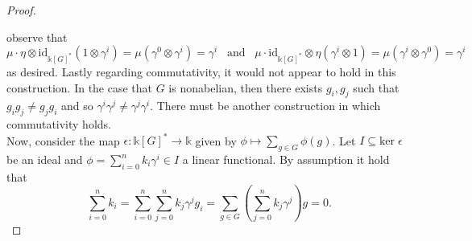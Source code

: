 \documentclass[ 12pt ]{article}
\begin{document}
\begin{enumerate}
\begin{proof}
\begin{center}
			\end{center}
			observe that $$\mu \cdot \eta \otimes \mathrm{id}_{\mathbb{k}[G]^\ast}(1 \otimes \gamma^i) = \mu(\gamma^0 \otimes \gamma^i) = \gamma^i\;\;\; \mathrm{and}\;\;\; \mu \cdot \mathrm{id}_{\mathbb{k}[G]^\ast} \otimes \eta(\gamma^i \otimes 1) = \mu(\gamma^i \otimes \gamma^0) = \gamma^i$$ as desired. Lastly regarding commutativity, it would not appear to hold in this construction. In the case that $G$ is nonabelian, then there exists $g_i, g_j$ such that $g_i g_j \neq g_j g_i$ and so $\gamma^i \gamma^j \neq \gamma^j \gamma^i$. There must be another construction in which commutativity holds. \\

			Now, consider the map $\epsilon : \mathbb{k}[G]^\ast \to \mathbb{k}$ given by $\phi \mapsto \sum_{g \in G} \phi(g)$. Let $I \subseteq \mathrm{ker}\; \epsilon$ be an ideal and $\phi = \sum_{i=0}^n k_i \gamma^i \in I$ a linear functional. By assumption it hold that $$\sum_{i=0}^n k_i = \sum_{i=0}^n \sum_{j=0}^n k_j \gamma^j g_i = \sum_{g \in G} \left ( \sum_{j=0}^n k_j \gamma^j \right ) g = 0.$$
		\end{proof}

\end{enumerate}
\end{document}
